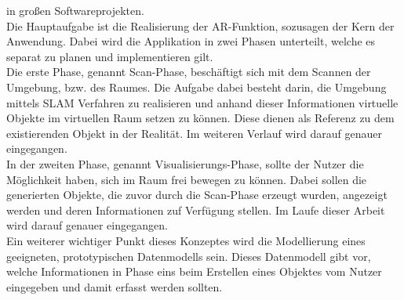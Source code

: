 in großen Softwareprojekten.
\\
\linebreak
Die Hauptaufgabe ist die Realisierung der \acl{AR}-Funktion, sozusagen der Kern der Anwendung. Dabei wird die Applikation in zwei 
Phasen unterteilt, welche es separat zu planen und implementieren gilt.
\\ 
\linebreak
Die erste Phase, genannt Scan-Phase, beschäftigt sich mit dem Scannen der Umgebung, bzw. des Raumes. Die Aufgabe dabei besteht darin, 
die Umgebung mittels \acs{SLAM} Verfahren zu realisieren und anhand dieser Informationen virtuelle Objekte im virtuellen Raum setzen zu können. 
Diese dienen als Referenz zu dem existierenden Objekt in der Realität. Im weiteren Verlauf wird darauf genauer eingegangen.
\\ 
\linebreak
In der zweiten Phase, genannt Visualisierungs-Phase, sollte der Nutzer die Möglichkeit haben, sich im Raum frei bewegen zu können. Dabei sollen die 
generierten Objekte, die zuvor durch die Scan-Phase erzeugt wurden, angezeigt werden und deren Informationen zuf Verfügung stellen. Im Laufe 
dieser Arbeit wird darauf genauer eingegangen. 
\\ 
Ein weiterer wichtiger Punkt dieses Konzeptes wird die Modellierung eines geeigneten, %
prototypischen Datenmodells sein. 
Dieses Datenmodell gibt vor, welche Informationen in Phase eins beim Erstellen eines Objektes vom Nutzer eingegeben und damit erfasst 
werden sollten. %
